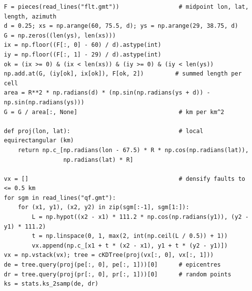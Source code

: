 \documentclass[11pt]{article}
\begin{document}
\begin{lstlisting}[caption={Fault-density gridding in 0.25\textdegree\ cells and
comparison of epicentre-to-fault distances with uniformly random points by a
two-sample Kolmogorov--Smirnov test (Python 3, NumPy, SciPy; excerpt of
fig\_fault\_density.sh).},label={lst:faults}]
F = pieces(read_lines("flt.gmt"))                 # midpoint lon, lat, length, azimuth
d = 0.25; xs = np.arange(60, 75.5, d); ys = np.arange(29, 38.75, d)
G = np.zeros((len(ys), len(xs)))
ix = np.floor((F[:, 0] - 60) / d).astype(int)
iy = np.floor((F[:, 1] - 29) / d).astype(int)
ok = (ix >= 0) & (ix < len(xs)) & (iy >= 0) & (iy < len(ys))
np.add.at(G, (iy[ok], ix[ok]), F[ok, 2])         # summed length per cell
area = R**2 * np.radians(d) * (np.sin(np.radians(ys + d)) - np.sin(np.radians(ys)))
G = G / area[:, None]                             # km per km^2

def proj(lon, lat):                               # local equirectangular (km)
    return np.c_[np.radians(lon - 67.5) * R * np.cos(np.radians(lat)),
                 np.radians(lat) * R]

vx = []                                           # densify faults to <= 0.5 km
for sgm in read_lines("qf.gmt"):
    for (x1, y1), (x2, y2) in zip(sgm[:-1], sgm[1:]):
        L = np.hypot((x2 - x1) * 111.2 * np.cos(np.radians(y1)), (y2 - y1) * 111.2)
        t = np.linspace(0, 1, max(2, int(np.ceil(L / 0.5)) + 1))
        vx.append(np.c_[x1 + t * (x2 - x1), y1 + t * (y2 - y1)])
vx = np.vstack(vx); tree = cKDTree(proj(vx[:, 0], vx[:, 1]))
de = tree.query(proj(pe[:, 0], pe[:, 1]))[0]      # epicentres
dr = tree.query(proj(pr[:, 0], pr[:, 1]))[0]      # random points
ks = stats.ks_2samp(de, dr)
\end{lstlisting}



\end{document}
